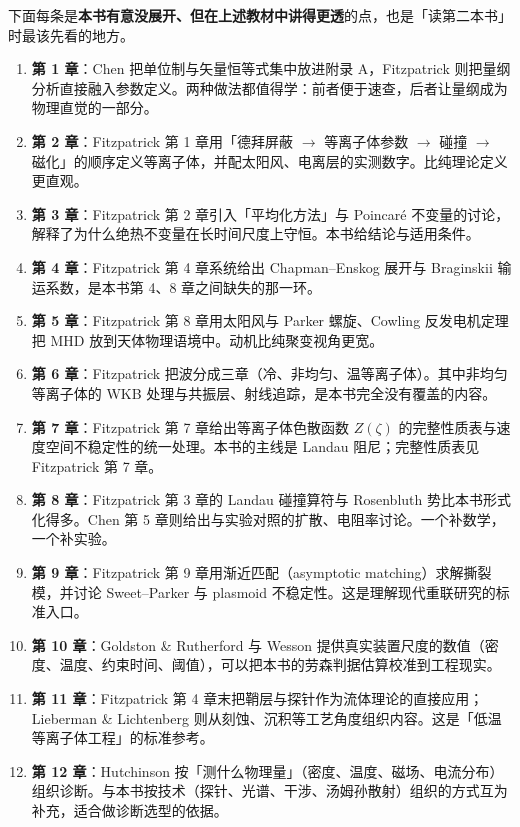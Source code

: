 下面每条是\textbf{本书有意没展开、但在上述教材中讲得更透}的点，也是「读第二本书」时最该先看的地方。

\begin{enumerate}
\item \textbf{第 1 章}：Chen 把单位制与矢量恒等式集中放进附录 A，Fitzpatrick 则把量纲分析直接融入参数定义。两种做法都值得学：前者便于速查，后者让量纲成为物理直觉的一部分。
\item \textbf{第 2 章}：Fitzpatrick 第 1 章用「德拜屏蔽 $\to$ 等离子体参数 $\to$ 碰撞 $\to$ 磁化」的顺序定义等离子体，并配太阳风、电离层的实测数字。比纯理论定义更直观。
\item \textbf{第 3 章}：Fitzpatrick 第 2 章引入「平均化方法」与 Poincaré 不变量的讨论，解释了为什么绝热不变量在长时间尺度上守恒。本书给结论与适用条件。
\item \textbf{第 4 章}：Fitzpatrick 第 4 章系统给出 Chapman--Enskog 展开与 Braginskii 输运系数，是本书第 4、8 章之间缺失的那一环。
\item \textbf{第 5 章}：Fitzpatrick 第 8 章用太阳风与 Parker 螺旋、Cowling 反发电机定理把 MHD 放到天体物理语境中。动机比纯聚变视角更宽。
\item \textbf{第 6 章}：Fitzpatrick 把波分成三章（冷、非均匀、温等离子体）。其中非均匀等离子体的 WKB 处理与共振层、射线追踪，是本书完全没有覆盖的内容。
\item \textbf{第 7 章}：Fitzpatrick 第 7 章给出等离子体色散函数 $Z(\zeta)$ 的完整性质表与速度空间不稳定性的统一处理。本书的主线是 Landau 阻尼；完整性质表见 Fitzpatrick 第 7 章。
\item \textbf{第 8 章}：Fitzpatrick 第 3 章的 Landau 碰撞算符与 Rosenbluth 势比本书形式化得多。Chen 第 5 章则给出与实验对照的扩散、电阻率讨论。一个补数学，一个补实验。
\item \textbf{第 9 章}：Fitzpatrick 第 9 章用渐近匹配（asymptotic matching）求解撕裂模，并讨论 Sweet--Parker 与 plasmoid 不稳定性。这是理解现代重联研究的标准入口。
\item \textbf{第 10 章}：Goldston \& Rutherford 与 Wesson 提供真实装置尺度的数值（密度、温度、约束时间、阈值），可以把本书的劳森判据估算校准到工程现实。
\item \textbf{第 11 章}：Fitzpatrick 第 4 章末把鞘层与探针作为流体理论的直接应用；Lieberman \& Lichtenberg 则从刻蚀、沉积等工艺角度组织内容。这是「低温等离子体工程」的标准参考。
\item \textbf{第 12 章}：Hutchinson 按「测什么物理量」（密度、温度、磁场、电流分布）组织诊断。与本书按技术（探针、光谱、干涉、汤姆孙散射）组织的方式互为补充，适合做诊断选型的依据。
\end{enumerate}


